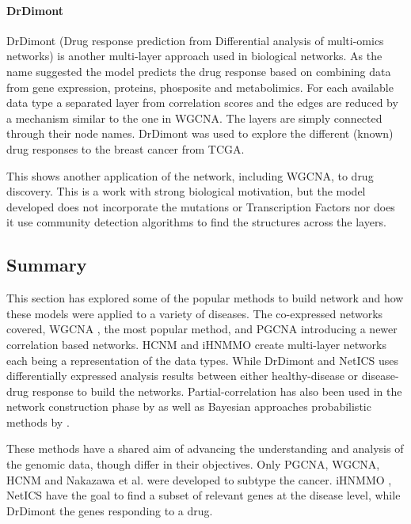 \paragraph*{DrDimont} \label{s:lit:drDimont}

DrDimont (Drug response prediction from Differential analysis of multi-omics networks) \citet{Hiort2022-lk} is another multi-layer approach used in biological networks. As the name suggested the model predicts the drug response based on combining data from gene expression, proteins, phosposite and metabolimics. For each available data type a separated layer from correlation scores and the edges are reduced by a mechanism similar to the one in WGCNA. The layers are simply connected through their node names. DrDimont was used to explore the different (known) drug responses to the breast cancer from TCGA.

This shows another application of the network, including WGCNA, to drug discovery. This is a work with strong biological motivation, but the model developed does not incorporate the mutations or Transcription Factors nor does it use community detection algorithms to find the structures across the layers.

\subsection{Summary}


This section has explored some of the popular methods to build network and how these models were applied to a variety of diseases. The co-expressed networks covered, WGCNA \cite{Langfelder2008-sn}, the most popular method, and PGCNA \cite{Care2019-ij} introducing a newer correlation based networks. HCNM \cite{Vangimalla2021-fc} and iHNMMO \citet{Peng2017-ik} create multi-layer networks each being a representation of the data types. While DrDimont \cite{Hiort2022-lk} and NetICS \citet{Dimitrakopoulos2018-br} uses differentially expressed analysis results between either healthy-disease or disease-drug response to build the networks. Partial-correlation has also been used in the network construction phase by \citet{De_la_Fuente2004-ts} as well as Bayesian approaches probabilistic methods by \cite{Nakazawa2021-yq, Tamada2011-ok, Tanaka2020-mw}.

These methods have a shared aim of advancing the understanding and analysis of the genomic data, though differ in their objectives. Only PGCNA, WGCNA, HCNM and Nakazawa et al.\cite{Care2019-ij, Langfelder2008-sn, Nakazawa2021-yq,  Vangimalla2021-fc} were developed to subtype the cancer. iHNMMO \cite{Peng2017-ik}, NetICS \cite{Dimitrakopoulos2018-br} have the goal to find a subset of relevant genes at the disease level, while DrDimont \cite{Hiort2022-lk} the genes responding to a drug. 

